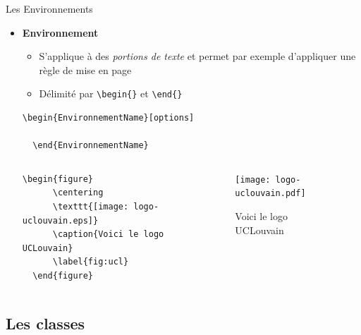 \begin{frame}[fragile]{Les Environnements}
  \begin{itemize}
  \item \textbf{Environnement}
      \begin{itemize}
      \item S'applique à des \textit{portions de texte} et permet par exemple d'appliquer une règle de mise en page
      \item Délimité par \lstinline|\begin{}| et \lstinline|\end{}|
      \end{itemize}
      \begin{lstlisting}[style=nonumbers]
  \begin{EnvironnementName}[options]

  \end{EnvironnementName}
      \end{lstlisting}
      \begin{center}
        \begin{columns}
        \begin{column}{0.5\textwidth}
        \begin{lstlisting}[style=nonumbers]
  \begin{figure}
      \centering
      \texttt{[image: logo-uclouvain.eps]}
      \caption{Voici le logo UCLouvain}
      \label{fig:ucl}
  \end{figure}
        \end{lstlisting}
        \end{column}
        \begin{column}{0.5\textwidth}
        \begin{figure}[!ht]
            \centering
            \texttt{[image: logo-uclouvain.pdf]}
            \caption{Voici le logo UCLouvain}
            \label{fig:ucl}
        \end{figure}
        \end{column}
        \end{columns}
      \end{center}
  \end{itemize}
\end{frame}

\subsection{Les classes}

